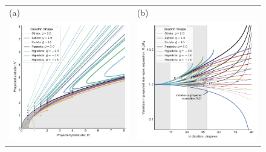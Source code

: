 \begin{figure}
  \centering
  \begin{tabular}{@{}ll@{}}
    (a) & (b) \\
    \includegraphics{figs/projected-R90-vs-Rc}
    & \includegraphics{figs/projected-R0-vs-i}

\end{tabular}
\end{figure}
